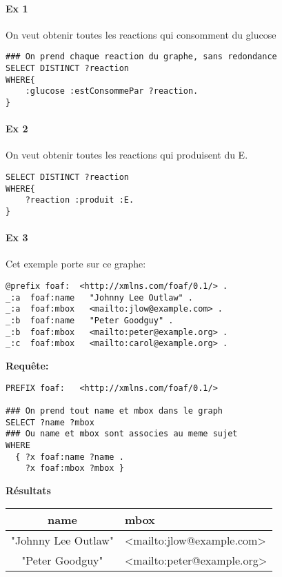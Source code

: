 \documentclass[11pt,a4paper]{article}
\begin{document}
\paragraph{Ex 1}
On veut obtenir toutes les reactions qui consomment du glucose
\begin{lstlisting}
### On prend chaque reaction du graphe, sans redondance
SELECT DISTINCT ?reaction
WHERE{
    :glucose :estConsommePar ?reaction.
}
\end{lstlisting}


\paragraph{Ex 2}
On veut obtenir toutes les reactions qui produisent du E.
\begin{lstlisting}
SELECT DISTINCT ?reaction
WHERE{
    ?reaction :produit :E.
}
\end{lstlisting}

\paragraph{Ex 3}
Cet exemple porte sur ce graphe:
\begin{lstlisting}
@prefix foaf:  <http://xmlns.com/foaf/0.1/> .
_:a  foaf:name   "Johnny Lee Outlaw" .
_:a  foaf:mbox   <mailto:jlow@example.com> .
_:b  foaf:name   "Peter Goodguy" .
_:b  foaf:mbox   <mailto:peter@example.org> .
_:c  foaf:mbox   <mailto:carol@example.org> .
\end{lstlisting}
\vspace{10pt}
\textbf{Requête:}
\begin{lstlisting}
PREFIX foaf:   <http://xmlns.com/foaf/0.1/>

### On prend tout name et mbox dans le graph
SELECT ?name ?mbox
### Ou name et mbox sont associes au meme sujet
WHERE
  { ?x foaf:name ?name .
    ?x foaf:mbox ?mbox }
\end{lstlisting}


\vspace{5pt}
\textbf{Résultats}
\begin{tabular}{c | l}
name & mbox \\
\hline
"Johnny Lee Outlaw" & <mailto:jlow@example.com>\\
"Peter Goodguy" & <mailto:peter@example.org>\\
\end{tabular}
\end{document}
